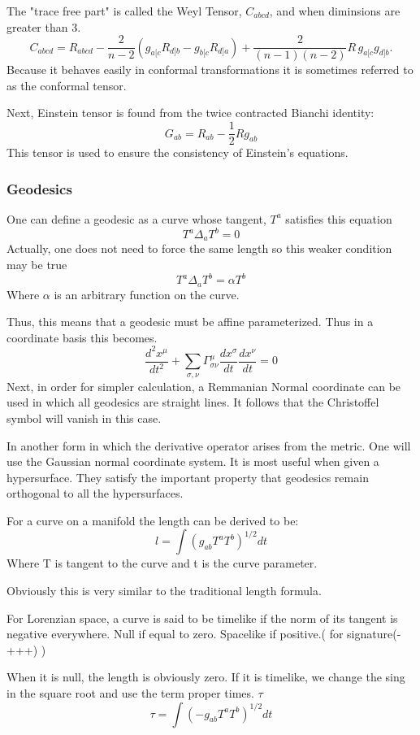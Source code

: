 The "trace free part" is called the Weyl Tensor, $C_{abcd}$, and when diminsions are greater than 3.
\[
    C_{abcd}
= R_{abcd}
- \frac{2}{n-2}\left(g_{a[c}R_{d]b} - g_{b[c}R_{d]a}\right)
+ \frac{2}{(n-1)(n-2)}R\, g_{a[c}g_{d]b}.
  \]
  Because it behaves easily in conformal transformations it is sometimes referred to as the conformal tensor.

  Next, Einstein tensor is found from the twice contracted Bianchi identity:
\[
G_{ab}=R_{ab}- \frac{1}{2}R g_{ab}
  \]
  This tensor is used to ensure the consistency of Einstein's equations.

\subsubsection{Geodesics}
One can define a geodesic as a curve whose tangent, $T^a$ satisfies this equation
\[
T^a \Delta_a T^b = 0
  \]
  Actually, one does not need to force the same length so this weaker condition may be true
\[
T^a \Delta_a T^b = \alpha T^b
  \]
  Where $\alpha$ is an arbitrary function on the curve.

Thus, this means that a geodesic must be affine parameterized. Thus in a coordinate basis this becomes.
\[
\frac{d^2 x^\mu}{dt^2}+ \sum_{\sigma, \nu} \Gamma^\mu_{\sigma \nu} \frac{dx^\sigma}{dt} \frac{dx^\nu}{dt}=0
  \]
  Next, in order for simpler calculation, a Remmanian Normal coordinate can be used in which all geodesics are straight lines. It follows that the Christoffel symbol will vanish in this case.

  In another form in which the derivative operator arises from the metric. One will use the Gaussian normal coordinate system. It is most useful when given a hypersurface. They satisfy the important property that geodesics remain orthogonal to all the hypersurfaces.

  For a curve on a manifold the length can be derived to be:
  \[
l = \int (g_{ab}T^a T^b)^{1/2}dt
\]
Where T is tangent to the curve and t is the curve parameter.

Obviously this is very similar to the traditional length formula.

For Lorenzian space, a curve is said to be timelike if the norm of its tangent is negative everywhere. Null if equal to zero. Spacelike if positive.( for signature(-+++) )

When it is null, the length is obviously zero. If it is timelike, we change the sing in the square root and use the term proper times. $\tau$
\[
\tau = \int (-g_{ab}T^aT^b)^{1/2}dt
\]

